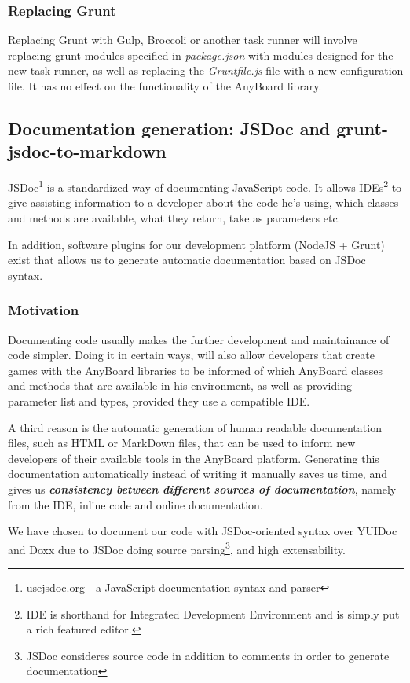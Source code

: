 \subsubsection{Replacing Grunt}
Replacing Grunt with Gulp, Broccoli or another task runner will involve replacing grunt modules specified in \emph{package.json} with modules designed for the new task runner, as well as replacing the \emph{Gruntfile.js} file with a new configuration file. It has no effect on the functionality of the AnyBoard library.

\subsection{Documentation generation: JSDoc and grunt-jsdoc-to-markdown}
JSDoc\footnote{\href{http://usejsdoc.org/}{usejsdoc.org} - a JavaScript documentation syntax and parser} is a standardized way of documenting JavaScript code. It allows IDEs\footnote{IDE is shorthand for Integrated Development Environment and is simply put a rich featured editor.} to give assisting information to a developer about the code he's using, which classes and methods are available, what they return, take as parameters etc. 

In addition, software plugins for our development platform (NodeJS + Grunt) exist that allows us to generate automatic documentation based on JSDoc syntax.

\subsubsection{Motivation}
Documenting code usually makes the further development and maintainance of code simpler. Doing it in certain ways, will also allow developers that create games with the AnyBoard libraries to be informed of which AnyBoard classes and methods that are available in his environment, as well as providing parameter list and types, provided they use a compatible IDE.

A third reason is the automatic generation of human readable documentation files, such as HTML or MarkDown files, that can be used to inform new developers of their available tools in the AnyBoard platform. Generating this documentation automatically instead of writing it manually saves us time, and gives us \emph{\textbf{consistency between different sources of documentation}}, namely from the IDE, inline code and online documentation.

We have chosen to document our code with JSDoc-oriented syntax over YUIDoc and Doxx due to JSDoc doing source parsing\footnote{JSDoc consideres source code in addition to comments in order to generate documentation}, and high extensability. 

